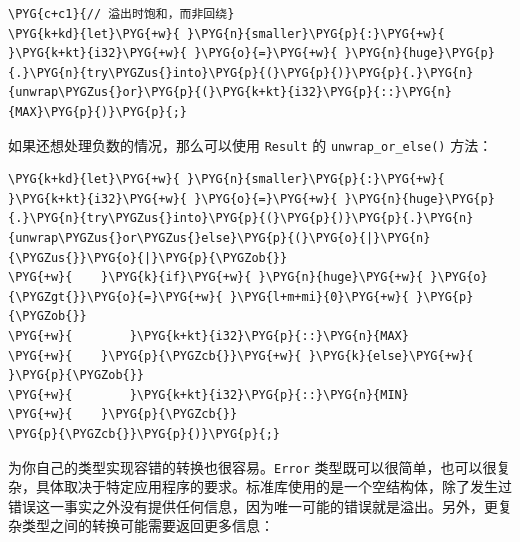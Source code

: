 \begin{Verbatim}[commandchars=\\\{\},breaklines=true,breakanywhere=true,fontsize=\codefont,xleftmargin=17bp]
\PYG{c+c1}{// 溢出时饱和，而非回绕}
\PYG{k+kd}{let}\PYG{+w}{ }\PYG{n}{smaller}\PYG{p}{:}\PYG{+w}{ }\PYG{k+kt}{i32}\PYG{+w}{ }\PYG{o}{=}\PYG{+w}{ }\PYG{n}{huge}\PYG{p}{.}\PYG{n}{try\PYGZus{}into}\PYG{p}{(}\PYG{p}{)}\PYG{p}{.}\PYG{n}{unwrap\PYGZus{}or}\PYG{p}{(}\PYG{k+kt}{i32}\PYG{p}{::}\PYG{n}{MAX}\PYG{p}{)}\PYG{p}{;}
\end{Verbatim}

如果还想处理负数的情况，那么可以使用 \texttt{Result} 的 \texttt{unwrap\_or\_else()} 方法：

\begin{Verbatim}[commandchars=\\\{\},breaklines=true,breakanywhere=true,fontsize=\codefont,xleftmargin=17bp]
\PYG{k+kd}{let}\PYG{+w}{ }\PYG{n}{smaller}\PYG{p}{:}\PYG{+w}{ }\PYG{k+kt}{i32}\PYG{+w}{ }\PYG{o}{=}\PYG{+w}{ }\PYG{n}{huge}\PYG{p}{.}\PYG{n}{try\PYGZus{}into}\PYG{p}{(}\PYG{p}{)}\PYG{p}{.}\PYG{n}{unwrap\PYGZus{}or\PYGZus{}else}\PYG{p}{(}\PYG{o}{|}\PYG{n}{\PYGZus{}}\PYG{o}{|}\PYG{p}{\PYGZob{}}
\PYG{+w}{    }\PYG{k}{if}\PYG{+w}{ }\PYG{n}{huge}\PYG{+w}{ }\PYG{o}{\PYGZgt{}}\PYG{o}{=}\PYG{+w}{ }\PYG{l+m+mi}{0}\PYG{+w}{ }\PYG{p}{\PYGZob{}}
\PYG{+w}{        }\PYG{k+kt}{i32}\PYG{p}{::}\PYG{n}{MAX}
\PYG{+w}{    }\PYG{p}{\PYGZcb{}}\PYG{+w}{ }\PYG{k}{else}\PYG{+w}{ }\PYG{p}{\PYGZob{}}
\PYG{+w}{        }\PYG{k+kt}{i32}\PYG{p}{::}\PYG{n}{MIN}
\PYG{+w}{    }\PYG{p}{\PYGZcb{}}
\PYG{p}{\PYGZcb{}}\PYG{p}{)}\PYG{p}{;}
\end{Verbatim}

为你自己的类型实现容错的转换也很容易。\texttt{Error} 类型既可以很简单，也可以很复杂，具体取决于特定应用程序的要求。标准库使用的是一个空结构体，除了发生过错误这一事实之外没有提供任何信息，因为唯一可能的错误就是溢出。另外，更复杂类型之间的转换可能需要返回更多信息：

